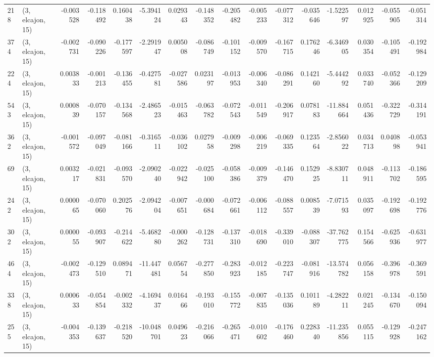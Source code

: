 \begin{tabular}{llrrrrrrrrrrrrrr}
218 &  (3, elcajon, 15) &  -0.003528 & -0.118492 &  0.160438 &   -5.394124 &  0.029343 &  -0.148352 &  -0.205482 & -0.005233 & -0.077312 & -0.035646 &   -1.522597 &  0.012925 &  -0.055905 &  -0.051314 \\
374 &  (3, elcajon, 15) &  -0.002731 & -0.090226 & -0.177597 &   -2.291947 &  0.005008 &  -0.086749 &  -0.101152 & -0.009570 & -0.167715 &  0.176246 &   -6.346905 &  0.030354 &  -0.105491 &  -0.192984 \\
224 &  (3, elcajon, 15) &   0.003833 & -0.001213 & -0.136455 &   -0.427581 & -0.027586 &   0.023197 &  -0.013953 & -0.006340 & -0.086291 &  0.142160 &   -5.444292 &  0.033740 &  -0.052366 &  -0.129209 \\
543 &  (3, elcajon, 15) &   0.000839 & -0.070157 & -0.134568 &   -2.486523 & -0.015463 &  -0.063782 &  -0.072543 & -0.011549 & -0.206917 &  0.078183 &  -11.884664 &  0.051436 &  -0.322729 &  -0.314191 \\
362 &  (3, elcajon, 15) &  -0.001572 & -0.097049 & -0.081166 &   -0.316511 & -0.036102 &   0.027958 &  -0.009298 & -0.006219 & -0.069335 &  0.123564 &   -2.856022 &  0.034713 &   0.040898 &  -0.053941 \\
69  &  (3, elcajon, 15) &   0.003217 & -0.021831 & -0.093570 &   -2.090240 & -0.022942 &  -0.025100 &  -0.058386 & -0.009379 & -0.146470 &  0.152925 &   -8.830711 &  0.048911 &  -0.113702 &  -0.186595 \\
242 &  (3, elcajon, 15) &   0.000065 & -0.070060 &  0.202576 &   -2.094204 & -0.007651 &  -0.000684 &  -0.072661 & -0.006112 & -0.088557 &  0.008539 &   -7.071593 &  0.035097 &  -0.192698 &  -0.192776 \\
302 &  (3, elcajon, 15) &   0.000055 & -0.093907 & -0.214622 &   -5.468280 & -0.000262 &  -0.128731 &  -0.137310 & -0.018690 & -0.339010 & -0.088307 &  -37.762775 &  0.154566 &  -0.625936 &  -0.631977 \\
464 &  (3, elcajon, 15) &  -0.002473 & -0.129510 &  0.089471 &  -11.447481 &  0.056754 &  -0.277850 &  -0.283923 & -0.012185 & -0.223747 & -0.081916 &  -13.574782 &  0.056158 &  -0.396978 &  -0.369591 \\
338 &  (3, elcajon, 15) &   0.000633 & -0.054854 & -0.002332 &   -4.169437 &  0.016466 &  -0.193010 &  -0.155772 & -0.007835 & -0.135036 &  0.101189 &   -4.282211 &  0.021245 &  -0.134670 &  -0.150094 \\
255 &  (3, elcajon, 15) &  -0.004353 & -0.139637 & -0.218520 &  -10.048701 &  0.049623 &  -0.216066 &  -0.265471 & -0.010602 & -0.176460 &  0.228340 &  -11.235856 &  0.055115 &  -0.129928 &  -0.247162 \\

\end{tabular}
